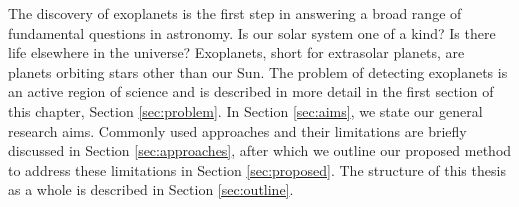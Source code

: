 

The discovery of exoplanets is the first step in answering a broad range of fundamental questions in astronomy. Is our solar system one of a kind? Is there life elsewhere in the universe? Exoplanets, short for extrasolar planets, are planets orbiting stars other than our Sun.
The problem of detecting exoplanets is an active region of science and is described in more detail in the first section of this chapter, Section \ref{sec:problem}. In Section \ref{sec:aims}, we state our general research aims. Commonly used approaches and their limitations are briefly discussed in Section \ref{sec:approaches}, after which we outline our proposed method to address these limitations in Section \ref{sec:proposed}. The structure of this thesis as a whole is described in Section \ref{sec:outline}.
